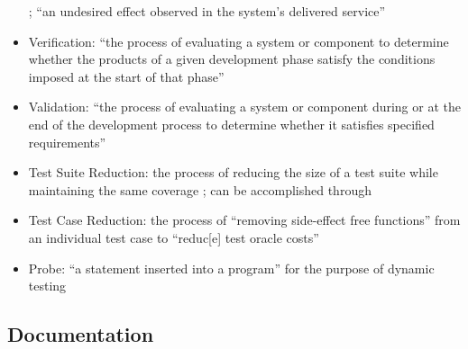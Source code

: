\begin{itemize}
            \citep[p.~400]{vanVliet2000}; ``an undesired effect observed in the
            system's delivered service'' \citep[p.~5-3]{SWEBOK2024}
      \item Verification: ``the process of evaluating a system or component
            to determine whether the products of a given development phase
            satisfy the conditions imposed at the start of that phase''
            \citep[p.~400]{vanVliet2000}
      \item Validation: ``the process of evaluating a system or component
            during or at the end of the development process to determine
            whether it satisfies specified requirements''
            \citep[p.~400]{vanVliet2000}
      \item Test Suite Reduction: the process of reducing the size of a test
            suite while maintaining the same coverage
            \citep[p.~519]{BarrEtAl2015}; can be accomplished through
      \item Test Case Reduction: the process of ``removing side-effect free
            functions'' from an individual test case to ``reduc[e] test oracle
            costs'' \citep[p.~519]{BarrEtAl2015}
      \item Probe: ``a statement inserted into a program'' for the purpose of
            dynamic testing \citep[p.~438]{PetersAndPedrycz2000}
\end{itemize}

\subsection{Documentation}

